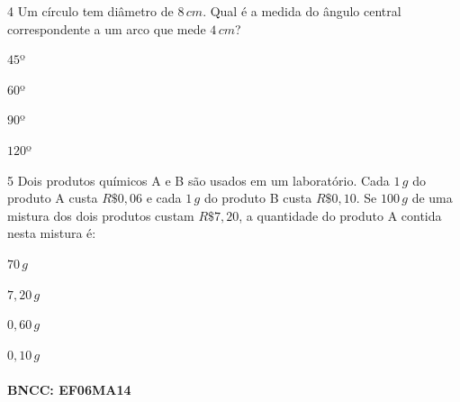 {\num{4}  Um círculo tem diâmetro de $8\,cm$. Qual é a medida do ângulo central
correspondente a um arco que mede $4\,cm$?

\begin{escolha}
\item $45$º
\item $60$º
\item $90$º
\item $120$º
\end{escolha}



\num{5}  Dois produtos químicos A e B são usados em um laboratório. Cada $1\,g$ do
produto A custa $R\$0,06$ e cada $1\,g$ do produto B custa
$R\$0,10$. Se $100\,g$ de uma mistura dos dois produtos custam $R\$7,20$, a
quantidade do produto A contida nesta mistura é:

\begin{escolha}
\item $70\,g$
\item $7,20\,g$
\item $0,60\,g$
\item $0,10\,g$
\end{escolha}

\paragraph{BNCC: EF06MA14 }

}
